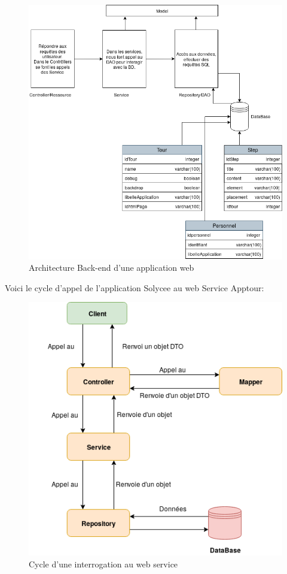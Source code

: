 \documentclass[12pt]{article}
\begin{document}
\begin{figure}[H]
	\centering
 		\includegraphics[width=1\textwidth]{diagrammes/Architecture_Apptour.png}
  		\caption{Architecture Back-end d'une application web}
	\end{figure}
	

Voici le cycle  d'appel de l'application Solycee au web Service Apptour:  

\begin{figure}[H]
	\centering
 		\includegraphics[width=1\textwidth]{diagrammes/schema_apptour.png}
  		\caption{Cycle d'une interrogation au web service}
	\end{figure}
	
\end{document}
